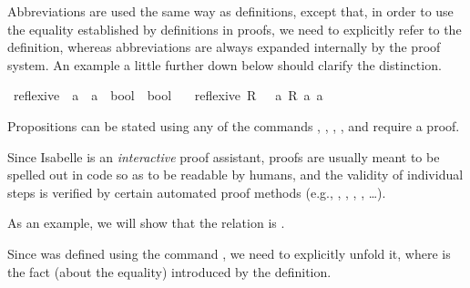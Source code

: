 \begin{isabellebody}
\begin{isamarkuptext}%
Abbreviations are used the same way as definitions, except that, in order to use the equality established by definitions in proofs, we need to explicitly refer to the definition, whereas abbreviations are always expanded internally by the proof system. An example a little further down below should clarify the distinction.%
\end{isamarkuptext}\isamarkuptrue%
\isamarkupfalse%
\ reflexive\ {\isacharcolon}{\kern0pt}{\isacharcolon}{\kern0pt}\ {\isacartoucheopen}{\isacharparenleft}{\kern0pt}{\isacharprime}{\kern0pt}a\ {\isasymRightarrow}\ {\isacharprime}{\kern0pt}a\ {\isasymRightarrow}\ bool{\isacharparenright}{\kern0pt}\ {\isasymRightarrow}\ bool{\isacartoucheclose}\isanewline
\ \ \ {\isacartoucheopen}reflexive\ R\ {\isasymequiv}\ {\isasymforall}\ a{\isachardot}{\kern0pt}\ R\ a\ a{\isacartoucheclose}%
\isadelimdocument
%
\endisadelimdocument
%
\isatagdocument
%
\isamarkuptrue%
%
\endisatagdocument
{\isafolddocument}%
%
\isadelimdocument
%
\endisadelimdocument
%
\begin{isamarkuptext}%
Propositions can be stated using any of the commands , , , , and require a proof.

Since Isabelle is an \emph{interactive} proof assistant, proofs are usually meant to be spelled out in code so as to be readable by humans, and the validity of individual steps is verified by certain automated proof methods (e.g.\@ {}, , , , , \dots). 

As an example, we will show that the relation  is .

Since  was defined using the command , we need to explicitly unfold it, where  is the fact (about the equality) introduced by the definition.


\end{isamarkuptext}
\end{isabellebody}
